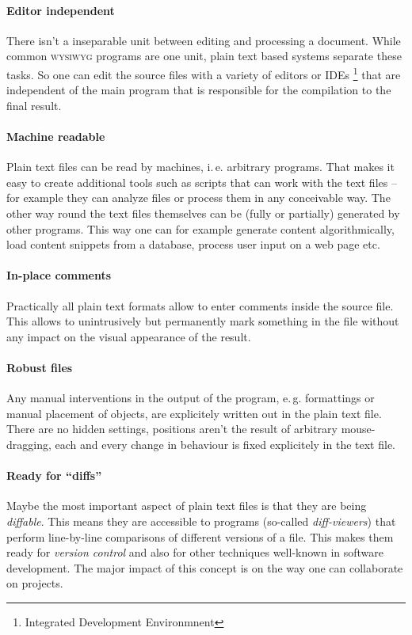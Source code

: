 \documentclass[../../LilyPond-Tutorials]{subfiles}
\begin{document}
\paragraph{Editor independent}
There isn't a inseparable unit between editing and processing a document.
While common \textsc{wysiwyg} programs are one unit, plain text based systems separate these tasks.
So one can edit the source files with a variety of editors or IDEs%
\footnote{Integrated Development Environmnent} that are independent of the main program that is responsible for the compilation to the final result.

\paragraph{Machine readable}
Plain text files can be read by machines, i.\,e. arbitrary programs.
That makes it easy to create additional tools such as scripts that can work with the text files -- for example they can analyze files or process them in any conceivable way.
The other way round the text files themselves can be (fully or partially) generated by other programs.
This way one can for example generate content algorithmically, load content snippets from a database, process user input on a web page etc.

\paragraph{In-place comments}
Practically all plain text formats allow to enter comments inside the source file.
This allows to unintrusively but permanently mark something in the file
without any impact on the visual appearance of the result.

\paragraph{Robust files}
Any manual interventions in the output of the program, e.\,g. formattings or manual placement of objects, are explicitely written out in the plain text file.
There are no hidden settings, positions aren't the result of arbitrary mouse-dragging, each and every change in behaviour is fixed explicitely in the text file.

\paragraph{Ready for “diffs”}
Maybe the most important aspect of plain text files is that they are being \emph{diffable}.
This means they are accessible to programs (so-called \emph{diff-viewers}) that perform line-by-line comparisons of different versions of a file.
This makes them ready for \emph{version control} and also for other techniques well-known in software development.
The major impact of this concept is on the way one can collaborate on projects.
\end{document}
